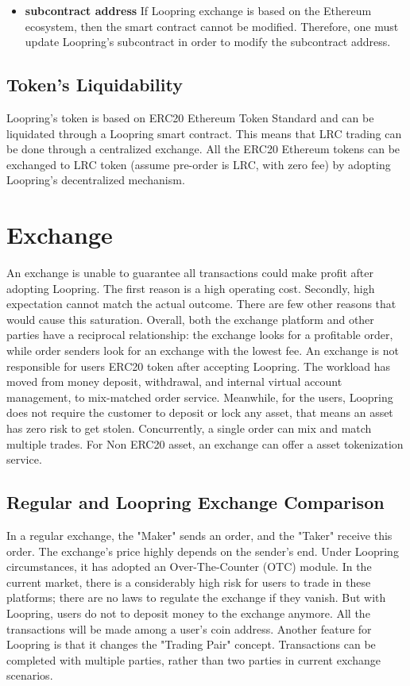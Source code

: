 \documentclass[UTF8,nofonts]{article}
\begin{document}
\begin{itemize}
   \item \textbf{subcontract address} If Loopring exchange is based on the Ethereum ecosystem, then the smart contract cannot be modified. Therefore, one must update Loopring's subcontract in order to modify the subcontract address.
 \end{itemize}


\subsection{Token's Liquidability}

Loopring's token is based on ERC20 Ethereum Token Standard and can be liquidated through a Loopring smart contract. This means that LRC trading can be done through a centralized exchange. All the ERC20 Ethereum tokens can be exchanged to LRC token (assume pre-order is LRC, with zero fee) by adopting Loopring's decentralized mechanism.


\section{Exchange\label{sec: exchange}}

An exchange is unable to guarantee all transactions could make profit after adopting Loopring. The first reason is a high operating cost. Secondly, high expectation cannot match the actual outcome. There are few other reasons that would cause this saturation. Overall,  both the exchange platform and other parties have a reciprocal relationship: the exchange looks for a profitable order, while order senders look for an exchange with the lowest fee.
An exchange is not responsible for users ERC20 token after accepting Loopring. The workload has moved from money deposit, withdrawal,  and internal virtual account management, to mix-matched order service. Meanwhile, for the users, Loopring does not require the customer to deposit or lock any asset, that means an asset has zero risk to get stolen. Concurrently, a single order can mix and match multiple trades. For Non ERC20 asset, an exchange can offer a asset tokenization service.

\subsection{Regular and Loopring Exchange Comparison}
In a regular exchange, the "Maker" sends an order, and the "Taker" receive this order. The exchange's price highly depends on the sender's end. Under Loopring circumstances, it has adopted an Over-The-Counter (OTC) module.
In the current market, there is a considerably high risk for users to trade in these platforms; there are no laws to regulate the exchange if they vanish. But with Loopring, users do not to deposit money to the exchange anymore. All the transactions will be made among a user's coin address.
Another feature for Loopring is that it changes the "Trading Pair" concept. Transactions can be completed with multiple parties, rather than two parties in current exchange scenarios.
\end{document}
